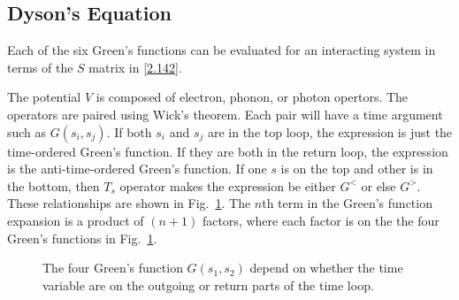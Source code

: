 \subsection{Dyson's Equation}
Each of the six Green's functions can be evaluated for an interacting system in terms of the $S$ matrix in \eqref{2.142}.

The potential $V$ is composed of electron, phonon, or photon opertors.
The operators are paired using Wick's theorem.
Each pair will have a time argument such as $G(s_i,s_j)$.
If both $s_i$ and $s_j$ are in the top loop, the expression is just the time-ordered Green's function.
If they are both in the return loop, the expression is the anti-time-ordered Green's function.
If one $s$ is on the top and other is in the bottom, then $T_s$ operator makes the expression be either $G^<$ or else $G^>$.
These relationships are shown in Fig.~\ref{f2.12}.
The $n$th term in the Green's function expansion is a product of $(n+1)$ factors, where each factor is on the the four Green's functions in Fig.~\ref{f2.12}.

\begin{figure}
\centering
{}
  \caption{The four Green's function $G(s_1,s_2)$ depend on whether the time variable are on the outgoing or return parts of the time loop. }
  \label{f2.12}
\end{figure}

